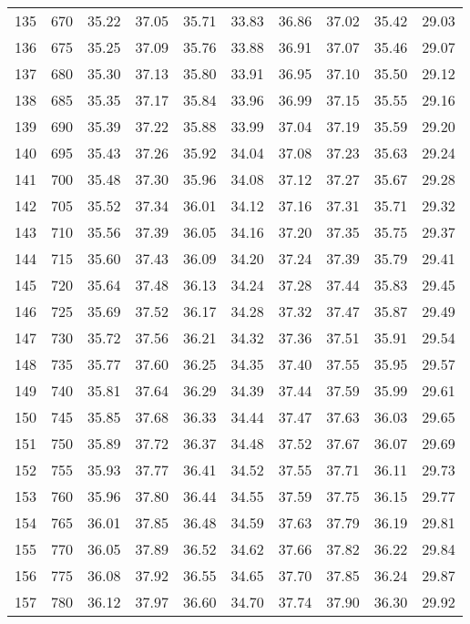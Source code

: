 \begin{longtable}{rrllllllll}
135 & 670 & 35.22 & 37.05 & 35.71 & 33.83 & 36.86 & 37.02 & 35.42 & 29.03 \\ 
136 & 675 & 35.25 & 37.09 & 35.76 & 33.88 & 36.91 & 37.07 & 35.46 & 29.07 \\ 
137 & 680 & 35.30 & 37.13 & 35.80 & 33.91 & 36.95 & 37.10 & 35.50 & 29.12 \\ 
138 & 685 & 35.35 & 37.17 & 35.84 & 33.96 & 36.99 & 37.15 & 35.55 & 29.16 \\ 
139 & 690 & 35.39 & 37.22 & 35.88 & 33.99 & 37.04 & 37.19 & 35.59 & 29.20 \\ 
140 & 695 & 35.43 & 37.26 & 35.92 & 34.04 & 37.08 & 37.23 & 35.63 & 29.24 \\ 
141 & 700 & 35.48 & 37.30 & 35.96 & 34.08 & 37.12 & 37.27 & 35.67 & 29.28 \\ 
142 & 705 & 35.52 & 37.34 & 36.01 & 34.12 & 37.16 & 37.31 & 35.71 & 29.32 \\ 
143 & 710 & 35.56 & 37.39 & 36.05 & 34.16 & 37.20 & 37.35 & 35.75 & 29.37 \\ 
144 & 715 & 35.60 & 37.43 & 36.09 & 34.20 & 37.24 & 37.39 & 35.79 & 29.41 \\ 
145 & 720 & 35.64 & 37.48 & 36.13 & 34.24 & 37.28 & 37.44 & 35.83 & 29.45 \\ 
146 & 725 & 35.69 & 37.52 & 36.17 & 34.28 & 37.32 & 37.47 & 35.87 & 29.49 \\ 
147 & 730 & 35.72 & 37.56 & 36.21 & 34.32 & 37.36 & 37.51 & 35.91 & 29.54 \\ 
148 & 735 & 35.77 & 37.60 & 36.25 & 34.35 & 37.40 & 37.55 & 35.95 & 29.57 \\ 
149 & 740 & 35.81 & 37.64 & 36.29 & 34.39 & 37.44 & 37.59 & 35.99 & 29.61 \\ 
150 & 745 & 35.85 & 37.68 & 36.33 & 34.44 & 37.47 & 37.63 & 36.03 & 29.65 \\ 
151 & 750 & 35.89 & 37.72 & 36.37 & 34.48 & 37.52 & 37.67 & 36.07 & 29.69 \\ 
152 & 755 & 35.93 & 37.77 & 36.41 & 34.52 & 37.55 & 37.71 & 36.11 & 29.73 \\ 
153 & 760 & 35.96 & 37.80 & 36.44 & 34.55 & 37.59 & 37.75 & 36.15 & 29.77 \\ 
154 & 765 & 36.01 & 37.85 & 36.48 & 34.59 & 37.63 & 37.79 & 36.19 & 29.81 \\ 
155 & 770 & 36.05 & 37.89 & 36.52 & 34.62 & 37.66 & 37.82 & 36.22 & 29.84 \\ 
156 & 775 & 36.08 & 37.92 & 36.55 & 34.65 & 37.70 & 37.85 & 36.24 & 29.87 \\ 
157 & 780 & 36.12 & 37.97 & 36.60 & 34.70 & 37.74 & 37.90 & 36.30 & 29.92 \\ 

\end{longtable}
